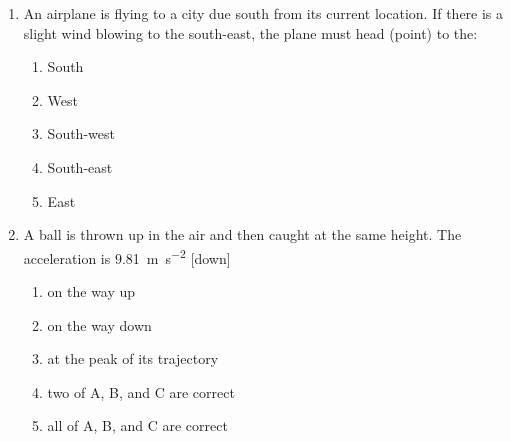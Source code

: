\begin{multicols}{2}
\begin{enumerate}[leftmargin=12pt]
  \item An airplane is flying to a city due south from its current location. If
    there is a slight wind blowing to the south-east, the plane must head
    (point) to the:
    \begin{enumerate}[noitemsep]
    \item South
    \item West
    \item South-west
    \item South-east
    \item East
    \end{enumerate}

  \item A ball is thrown up in the air and then caught at the same height.
    The acceleration is \SI{9.81}{\metre\per\second\squared} [down]
    \begin{enumerate}[noitemsep]
    \item on the way up
    \item on the way down
    \item at the peak of its trajectory
    \item two of A, B, and C are correct
    \item all of A, B, and C are correct
  \end{enumerate}


\end{enumerate}
\end{multicols}
